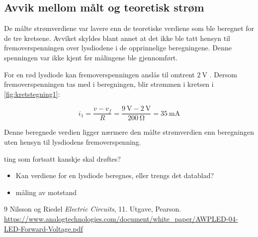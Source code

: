\documentclass[11pt,a4paper,twocolumn]{article}
\begin{document}
\subsection{Avvik mellom målt og teoretisk strøm} 

De målte strømverdiene var lavere enn de teoretiske verdiene som ble
beregnet for de tre kretsene. Avviket skyldes blant annet at det ikke
ble tatt hensyn til fremoverspenningen over lysdiodene i de opprinnelige
beregningene. Denne spenningen var ikke kjent før målingene ble
gjennomført.

For en rød lysdiode kan fremoverspenningen anslås til omtrent
$\qty{2}{\volt}$ \cite{analogtech}. Dersom fremoverspenningen tas med i
beregningen, blir strømmen i kretsen i \cref{fig:kretstegning1}:

$$
i_1 = \frac{v - v_f}{R} = \frac{\qty{9}{\volt} - \qty{2}{\volt}}{\qty{200}{\ohm}} = \qty{35}{\milli\ampere}
$$

Denne beregnede verdien ligger nærmere den målte strømverdien enn
beregningen uten hensyn til lysdiodens fremoverspenning.


\bigskip

ting som fortsatt kanskje skal drøftes?
\begin{itemize}
\item Kan verdiene for en lysdiode beregnes, eller trengs det datablad?
\item måling av motstand
\end{itemize}

\begin{thebibliography}{9}
Nilsson og Riedel \textit{Electric Circuits}, 11. Utgave, Pearson.
\url{https://www.analogtechnologies.com/document/white_paper/AWPLED-04-LED-Forward-Voltage.pdf}
\end{thebibliography}
\end{document}
